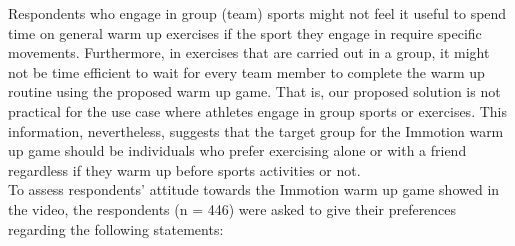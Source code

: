 Respondents who engage in group (team) sports might not feel it useful to spend time on general warm up exercises if the sport they engage in require specific movements. Furthermore, in exercises that are carried out in a group, it might not be time efficient to wait for every team member to complete the warm up routine using the proposed warm up game. That is, our proposed solution is not practical for the use case where athletes engage in group sports or exercises. This information, nevertheless, suggests that the target group for the Immotion warm up game should be individuals who prefer exercising alone or with a friend regardless if they warm up before sports activities or not. %
\\To assess respondents' attitude towards the Immotion warm up game showed in the video, the respondents (n = 446) were asked to give their preferences regarding the following statements:
